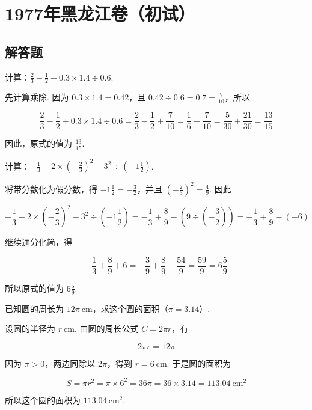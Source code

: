 \chapter{1977年黑龙江卷（初试）}

\section{解答题}

\begin{problem}
计算：\( \frac{2}{3}-\frac{1}{2}+0.3\times1.4\div0.6 \).
\end{problem}

\begin{solution}
先计算乘除. 因为 \(0.3\times1.4=0.42\)，且 \(0.42\div0.6=0.7=\frac{7}{10}\)，所以

\[
\frac{2}{3}-\frac{1}{2}+0.3\times1.4\div0.6
=\frac{2}{3}-\frac{1}{2}+\frac{7}{10}
=\frac{1}{6}+\frac{7}{10}
=\frac{5}{30}+\frac{21}{30}
=\frac{13}{15}
\]

因此，原式的值为 \(\frac{13}{15}\).
\end{solution}

\begin{problem}
计算：\( -\frac{1}{3}+2\times\left(-\frac{2}{3}\right)^2-3^2\div\left(-1\frac{1}{2}\right) \).
\end{problem}

\begin{solution}
将带分数化为假分数，得 \(-1\frac{1}{2}=-\frac{3}{2}\)，并且 \(\left(-\frac{2}{3}\right)^2=\frac{4}{9}\). 因此

\[
-\frac{1}{3}+2\times\left(-\frac{2}{3}\right)^2-3^2\div\left(-1\frac{1}{2}\right)
=-\frac{1}{3}+\frac{8}{9}-\left(9\div\left(-\frac{3}{2}\right)\right)
=-\frac{1}{3}+\frac{8}{9}-(-6)
\]

继续通分化简，得

\[
-\frac{1}{3}+\frac{8}{9}+6=-\frac{3}{9}+\frac{8}{9}+\frac{54}{9}
=\frac{59}{9}=6\frac{5}{9}
\]

所以原式的值为 \(6\frac{5}{9}\).
\end{solution}

\begin{problem}
已知圆的周长为 \(12\pi\mathrm{~cm}\)，求这个圆的面积（\(\pi=3.14\)）.
\end{problem}

\begin{solution}
设圆的半径为 \(r\mathrm{~cm}\). 由圆的周长公式 \(C=2\pi r\)，有

\[
2\pi r=12\pi
\]

因为 \(\pi>0\)，两边同除以 \(2\pi\)，得到 \(r=6\mathrm{~cm}\). 于是圆的面积为

\[
S=\pi r^2=\pi\times6^2=36\pi=36\times3.14=113.04\mathrm{~cm}^2
\]

所以这个圆的面积为 \(113.04\mathrm{~cm}^2\).
\end{solution}

